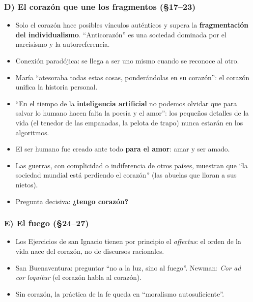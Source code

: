 \documentclass[10pt,a4paper]{article}
\begin{document}
\subsubsection{D) El corazón que une los fragmentos (\S{}17--23)}
\begin{itemize}
\item Solo el corazón hace posibles vínculos auténticos y supera la \textbf{fragmentación del individualismo}. ``Anticorazón'' es una sociedad dominada por el narcisismo y la autorreferencia.
\item Conexión paradójica: se llega a ser uno mismo cuando se reconoce al otro.
\item María ``atesoraba todas estas cosas, ponderándolas en su corazón'': el corazón unifica la historia personal.
\item ``En el tiempo de la \textbf{inteligencia artificial} no podemos olvidar que para salvar lo humano hacen falta la poesía y el amor'': los pequeños detalles de la vida (el tenedor de las empanadas, la pelota de trapo) nunca estarán en los algoritmos.
\item El ser humano fue creado ante todo \textbf{para el amor}: amar y ser amado.
\item Las guerras, con complicidad o indiferencia de otros países, muestran que ``la sociedad mundial está perdiendo el corazón'' (las abuelas que lloran a sus nietos).
\item Pregunta decisiva: \textbf{¿tengo corazón?}
\end{itemize}

\subsubsection{E) El fuego (\S{}24--27)}
\begin{itemize}
\item Los Ejercicios de san Ignacio tienen por principio el \textit{affectus}: el orden de la vida nace del corazón, no de discursos racionales.
\item San Buenaventura: preguntar ``no a la luz, sino al fuego''. Newman: \textit{Cor ad cor loquitur} (el corazón habla al corazón).
\item Sin corazón, la práctica de la fe queda en ``moralismo autosuficiente''.
\end{itemize}
\end{document}
